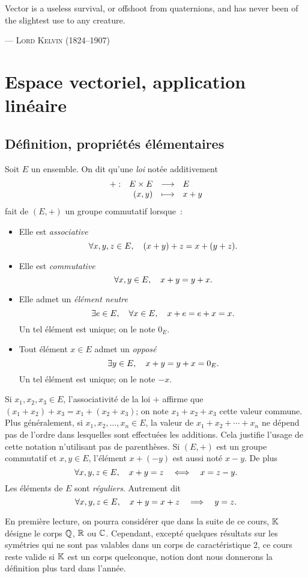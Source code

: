 \documentclass{magnolia}
\begin{document}
\setlength{}
\epigraph{\og Vector is a useless survival, or offshoot from quaternions, and has never been of the slightest use to any creature. \fg}{--- \textsc{Lord Kelvin (1824--1907)}}
\magtoc

\section{Espace vectoriel, application linéaire}
\subsection{Définition, propriétés élémentaires}

\begin{definition}
Soit $E$ un ensemble. On dit qu'une \emph{loi} notée additivement
\[\begin{array}[t]{lrcl} \displaystyle{+} : & \displaystyle{E\times E} & \longrightarrow & \displaystyle{E} \\ & \displaystyle{\left(x,y\right)} & \longmapsto & \displaystyle{x+y} \end{array}\]
fait de $(E,+)$ un groupe commutatif lorsque~:
\begin{itemize}
\item Elle est \emph{associative}
  \[\forall x,y,z\in E,\quad (x+y)+z=x+(y+z).\]
\item Elle est \emph{commutative}
  \[\forall x,y\in E,\quad x+y=y+x.\]
\item Elle admet un \emph{élément neutre}~
  \[\exists e\in E,\quad \forall x\in E ,\quad x+e=e+x=x.\]
  Un tel élément est unique; on le note $0_E$.
\item Tout élément $x\in E$ admet un \emph{opposé}~
\[\exists y\in E,\quad x+y=y+x=0_E.\]
Un tel élément est unique; on le note $-x$.
\end{itemize}
\end{definition}

\begin{remarques}
\remarque Si $x_1,x_2,x_3\in E$, l'associativité de la loi $+$ affirme que
  $(x_1+x_2)+x_3=x_1+(x_2+x_3)$; on note $x_1+x_2+x_3$ cette valeur commune. Plus
  généralement, si $x_1,x_2,\ldots,x_n\in E$, la valeur de $x_1+x_2+\cdots+x_n$ ne dépend
  pas de l'ordre dans lesquelles sont effectuées les additions. Cela justifie l'usage de
  cette notation n'utilisant pas de parenthèses.
\remarque Si $(E,+)$ est un groupe commutatif et $x,y\in E$, l'élément $x+(-y)$ est aussi
  noté $x-y$. De plus
  \[\forall x,y,z\in E,\quad x+y=z \quad\Longleftrightarrow\quad x = z-y.\]
\remarque Les éléments de $E$ sont \emph{réguliers}. Autrement dit
  \[\forall x,y,z\in E,\quad x+y=x+z \quad\Longrightarrow\quad  y=z.\]
\end{remarques}

En première lecture, on pourra considérer que dans la suite de ce cours, $\mathbb{K}$ désigne le corps $\mathbb{Q}$, $\mathbb{R}$ ou
$\mathbb{C}$. Cependant, excepté quelques résultats sur les symétries qui ne sont pas valables dans
un corps de caractéristique 2, ce cours reste valide si $\mathbb{K}$ est un corps quelconque, notion
dont nous donnerons la définition plus tard dans l'année.
\vspace{2ex}
\end{document}

